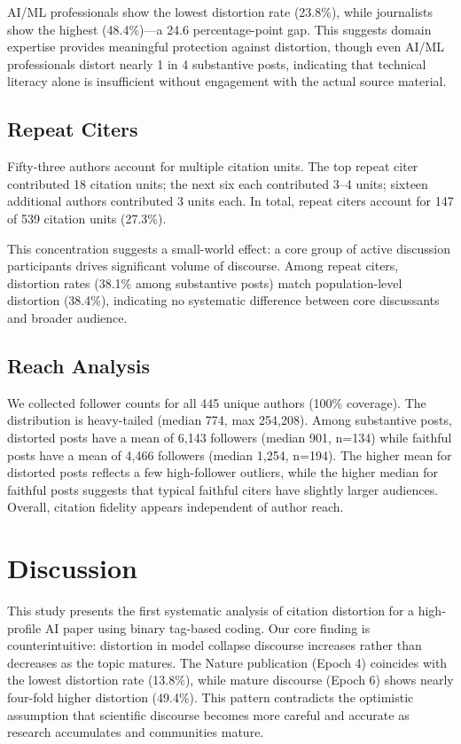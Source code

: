 \documentclass[twocolumn,11pt]{article}
\begin{document}
AI/ML professionals show the lowest distortion rate (23.8\%), while journalists show the highest (48.4\%)---a 24.6 percentage-point gap. This suggests domain expertise provides meaningful protection against distortion, though even AI/ML professionals distort nearly 1 in 4 substantive posts, indicating that technical literacy alone is insufficient without engagement with the actual source material.

\subsection{Repeat Citers}

Fifty-three authors account for multiple citation units. The top repeat citer contributed 18 citation units; the next six each contributed 3--4 units; sixteen additional authors contributed 3 units each. In total, repeat citers account for 147 of 539 citation units (27.3\%).

This concentration suggests a small-world effect: a core group of active discussion participants drives significant volume of discourse. Among repeat citers, distortion rates (38.1\% among substantive posts) match population-level distortion (38.4\%), indicating no systematic difference between core discussants and broader audience.

\subsection{Reach Analysis}

We collected follower counts for all 445 unique authors (100\% coverage). The distribution is heavy-tailed (median 774, max 254,208). Among substantive posts, distorted posts have a mean of 6,143 followers (median 901, n=134) while faithful posts have a mean of 4,466 followers (median 1,254, n=194). The higher mean for distorted posts reflects a few high-follower outliers, while the higher median for faithful posts suggests that typical faithful citers have slightly larger audiences. Overall, citation fidelity appears independent of author reach.


\section{Discussion}

This study presents the first systematic analysis of citation distortion for a high-profile AI paper using binary tag-based coding. Our core finding is counterintuitive: distortion in model collapse discourse increases rather than decreases as the topic matures. The Nature publication (Epoch 4) coincides with the lowest distortion rate (13.8\%), while mature discourse (Epoch 6) shows nearly four-fold higher distortion (49.4\%). This pattern contradicts the optimistic assumption that scientific discourse becomes more careful and accurate as research accumulates and communities mature.
\end{document}
